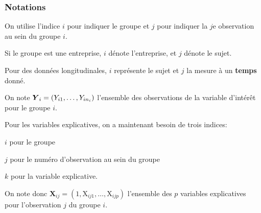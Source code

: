 \documentclass{beamer}
\begin{document}
\begin{frame}
\frametitle{Notations}
\bi
\item On utilise l'indice $i$ pour indiquer le groupe et $j$ pour indiquer la $j$e observation au sein du groupe $i$.
\bi

\item Si le groupe est une entreprise, $i$ dénote l'entreprise, et $j$ dénote le sujet.
\item Pour des données longitudinales, $i$ représente le sujet et $j$ la mesure à un \textbf{temps} donné.
\ei
\item On note $\boldsymbol {Y}_i=(Y_{i1}, \ldots, Y_{in_i})$ l'\alert{ensemble des observations} de la variable d'intérêt pour le groupe $i$. 
\item Pour les variables explicatives, on a maintenant besoin de trois indices:
\bi \item $i$ pour le groupe
\item $j$ pour le numéro d'observation au sein du groupe
\item  $k$ pour la variable explicative.
\ei
\item On note donc  $\mathbf{X}_{ij}=(1, \mathrm{X}_{ij1}, \ldots, \mathrm{X}_{ijp})$ l'ensemble des $p$ variables explicatives pour l'observation $j$ du groupe $i$.
\ei
\end{frame}
\end{document}
